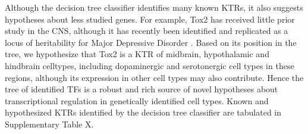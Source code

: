 Although the decision tree classifier identifies many known KTRs, it also suggests hypotheses about less studied genes. For example, Tox2 has received little prior study in the CNS, although it has recently been identified and replicated as a locus of heritability for Major Depressive Disorder \cite{Zeng_2016}. Based on its position in the tree, we hypothesize that Tox2 is a KTR of midbrain, hypothalamic and hindbrain celltypes, including dopaminergic and serotonergic cell types in these regions, although its expression in other cell types may also contribute. Hence the tree of identified TFs is a robust and rich source of novel hypotheses about transcriptional regulation in genetically identified cell types. Known and hypothesized KTRs identified by the decision tree classifier are tabulated in Supplementary Table X.